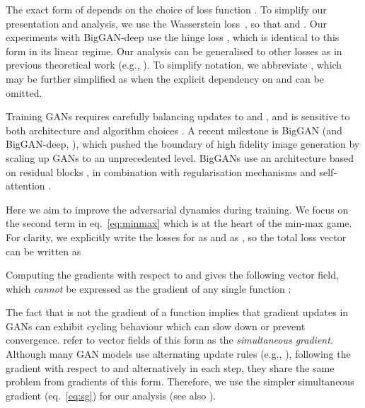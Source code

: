 \documentclass{article} \usepackage{iclr2020_conference,times}
\begin{document}
The exact form of  depends on the choice of loss function \citep{goodfellow2014generative,arjovsky2017wasserstein,nowozin2016f}. To simplify our presentation and analysis, we use the Wasserstein loss~\citep{arjovsky2017wasserstein}, so that  and . Our experiments with BigGAN-deep use the hinge loss \citep{lim2017geometric,tran2017hierarchical}, which is identical to this form in its linear regime. 
Our analysis can be generalised to other losses as in previous theoretical work (e.g., \citealt{arora2017generalization}).
To simplify notation, we abbreviate , which may be further simplified as  when the explicit dependency on  and  can be omitted.

Training GANs requires carefully balancing updates to  and , and is sensitive to both architecture and algorithm choices \citep{salimans2016improved,radford2015unsupervised}. A recent milestone is BigGAN (and BigGAN-deep, \citealt{brock2018large}), which pushed the boundary of high fidelity image generation by scaling up GANs to an unprecedented level. BigGANs use an architecture based on residual blocks \citep{he2016deep}, in combination with regularisation mechanisms and self-attention \citep{saxe2013exact, miyato2018spectral,zhang2019self}.

Here we aim to improve the adversarial dynamics during training. We focus on the second term in eq.~\ref{eq:minmax} which is at the heart of the min-max game. For clarity, we explicitly write the losses for  as  and  as , so the total loss vector can be written as


Computing the gradients with respect to  and  gives the following vector field, which \emph{cannot} be expressed as the gradient of any single function \citep{balduzzi2018mechanics}:


The fact that  is not the gradient of a function implies that gradient updates in GANs can exhibit cycling behaviour which can slow down or prevent convergence. 
\citet{balduzzi2018mechanics} refer to vector fields of this form as the \emph{simultaneous gradient}. Although many GAN models use alternating update rules (e.g., \citealt{goodfellow2014generative,brock2018large}), following the gradient with respect to  and  alternatively in each step, they share the same problem from gradients of this form. Therefore, we use the simpler simultaneous gradient (eq.~\ref{eq:sg}) for our analysis (see also \citealt{mescheder2017,mescheder2018training}).
\end{document}
